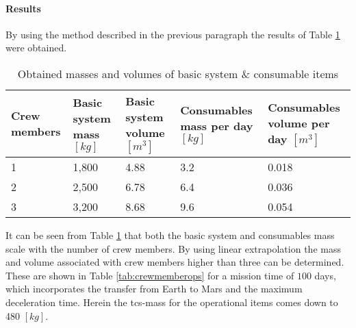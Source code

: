 \paragraph{Results}
By using the method described in the previous paragraph the results of Table \ref{tab:operationalest} were obtained.
\begin{table}[h]
	\centering
	\caption{Obtained masses and volumes of basic system \& consumable items}
	\begin{tabular}{|p{1.9cm}|p{2.7cm}|p{2.7cm}|p{3.5cm}|p{3.6cm}|}
		\hline
		\textbf{Crew members} & \textbf{Basic system mass $[kg]$} & \textbf{Basic system volume $[m^{3}]$} & \textbf{Consumables mass per day $[kg]$} & \textbf{Consumables volume per day $[m^{3}]$} \\ \hline \hline
		1 & 1,800 & 4.88 & 3.2 & 0.018 \\
		2 & 2,500 & 6.78 & 6.4 & 0.036 \\
		3 & 3,200 & 8.68 & 9.6 & 0.054 \\
		\hline
	\end{tabular}
	\label{tab:operationalest}
\end{table}
It can be seen from Table \ref{tab:operationalest} that both the basic system and consumables mass scale with the number of crew members. By using linear extrapolation the mass and volume associated with crew members higher than three can be determined. These are shown in Table \ref{tab:crewmemberops} for a mission time of $100$ days, which incorporates the transfer from Earth to Mars and the maximum deceleration time. Herein the \gls{tcs}-mass for the operational items comes down to 480 $[kg]$.\\

